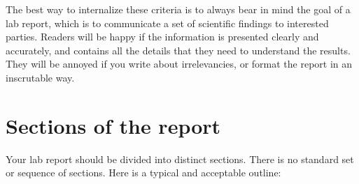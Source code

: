 \documentclass[11pt,a4paper]{article}
\begin{document}
\noindent
The best way to internalize these criteria is to always bear in mind
the goal of a lab report, which is to communicate a set of scientific
findings to interested parties.  Readers will be happy if the
information is presented clearly and accurately, and contains all the
details that they need to understand the results.  They will be
annoyed if you write about irrelevancies, or format the report in an
inscrutable way.

\section{Sections of the report}

Your lab report should be divided into distinct sections.  There is no
standard set or sequence of sections.  Here is a typical and
acceptable outline:
\end{document}
